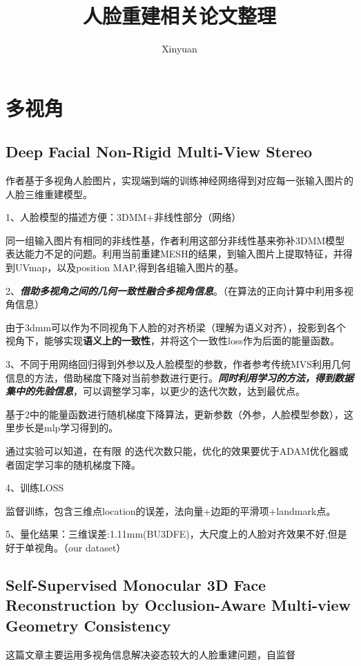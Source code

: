 \documentclass[UTF8,12pt]{article} %
\theoremstyle{definition}
\begin{document}
\title{人脸重建相关论文整理}
\author{Xinyuan}
\maketitle
\section{多视角}
\subsection{Deep Facial Non-Rigid Multi-View Stereo}


作者基于多视角人脸图片，实现端到端的训练神经网络得到对应每一张输入图片的人脸三维重建模型。


1、人脸模型的描述方便：3DMM+非线性部分（网络）
	
	同一组输入图片有相同的非线性基，作者利用这部分非线性基来弥补3DMM模型表达能力不足的问题。利用当前重建MESH的结果，到输入图片上提取特征，并得到UVmap，以及position MAP,得到各组输入图片的基。
	
	
2、\textit{\textbf{借助多视角之间的几何一致性融合多视角信息}}。（在算法的正向计算中利用多视角信息）
	
	由于3dmm可以作为不同视角下人脸的对齐桥梁（理解为语义对齐），投影到各个视角下，能够实现\textbf{语义上的一致性}，并将这个一致性loss作为后面的能量函数。
	
3、不同于用网络回归得到外参以及人脸模型的参数，作者参考传统MVS利用几何信息的方法，借助梯度下降对当前参数进行更行。\textit{\textbf{同时利用学习的方法，得到数据集中的先验信息}}，可以调整学习率，以更少的迭代次数，达到最优点。

	基于2中的能量函数进行随机梯度下降算法，更新参数（外参，人脸模型参数），这里步长是mlp学习得到的。
	
	通过实验可以知道，在有限 的迭代次数只能，优化的效果要优于ADAM优化器或者固定学习率的随机梯度下降。

4、训练LOSS
	
	监督训练，包含三维点location的误差，法向量+边距的平滑项+landmark点。

5、量化结果：三维误差:1.11mm(BU3DFE)，大尺度上的人脸对齐效果不好,但是好于单视角。（our dataset）
	
\subsection{Self-Supervised Monocular 3D Face Reconstruction by Occlusion-Aware Multi-view Geometry Consistency}
这篇文章主要运用多视角信息解决姿态较大的人脸重建问题，自监督
\end{document}
